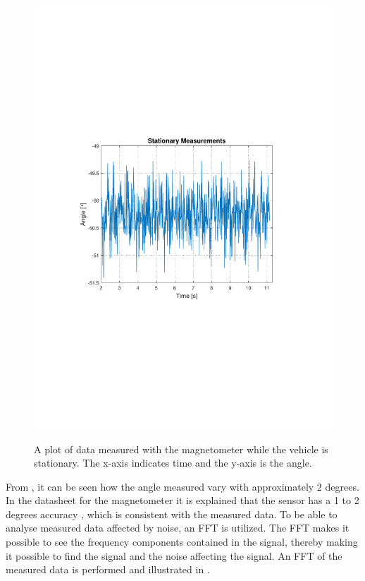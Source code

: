 \begin{figure}[H]
  \centering
  {
    \includegraphics[width=1.1\textwidth]{figures/StationaryMeasurements.pdf}
  }
  \caption{A plot of data measured with the magnetometer while the vehicle is stationary. The x-axis indicates time and the y-axis is the angle.}
  \label{fig:StationaryMeasurementsMagnato}
\end{figure}

From , it can be seen how the angle measured vary with approximately 2 degrees. In the datasheet for the magnetometer it is explained that the sensor has a 1 to 2 degrees accuracy \cite{HMC5883L}, which is consistent with the measured data. To be able to analyse measured data affected by noise, an FFT is utilized. The FFT makes it possible to see the frequency components contained in the signal, thereby making it possible to find the signal and the noise affecting the signal. An FFT of the measured data is performed and illustrated in .


